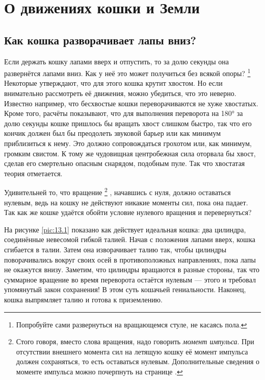 \chapter{О движениях кошки и Земли}

\section{Как кошка разворачивает лапы вниз?}

Если держать кошку лапами вверх и отпустить, то за долю секунды она развернётся лапами вниз.
Как у неё это может получиться без всякой опоры?%
\footnote{Попробуйте сами развернуться на вращающемся стуле, не касаясь пола.}
Некоторые утверждают, что для этого кошка крутит хвостом.
Но если внимательно рассмотреть её движения, можно убедиться, что это неверно.
Известно например, что бесхвостые кошки переворачиваются не хуже хвостатых.
Кроме того, расчёты показывают, что для выполнения переворота на 180° за долю секунды кошке пришлось бы вращать хвост слишком быстро, так что его кончик должен был бы преодолеть звуковой барьер или как минимум приблизиться к нему.
Это должно сопровождаться грохотом или, как минимум, громким свистом.
К тому же чудовищная центробежная сила оторвала бы хвост, сделав его смертельно опасным снарядом, подобным пуле.
Так что хвостатая теория отметается.

Удивительней то, что вращение%
\footnote{Стого говоря, вместо слова вращения, надо говорить \emph{момент импульса}.
При отсутствии внешнего момента сил на летящую кошку её момент импульса должен сохраняться, то есть оставаться нулевым.
Дополнительные сведения о моменте импульса можно почерпнуть на странице \pageref{Момент импульса}.}%
, начавшись с нуля, должно оставаться нулевым, ведь на кошку не действуют никакие моменты сил, пока она падает.
Так как же кошке удаётся обойти условие нулевого вращения и перевернуться?

На рисунке \ref{pic:13.1} показано как действует идеальная кошка: два цилиндра, соединённые невесомой гибкой талией.
Начав с положения лапами вверх, кошка сгибается в талии.
Затем она изворачивает талию так, чтобы цилиндры поворачивались вокруг своих осей в противоположных направлениях, пока лапы не окажутся внизу.
Заметим, что цилиндры вращаются в разные стороны, так что суммарное вращение во время переворота остаётся нулевым --- этого и требовал упомянутый закон сохранения!
В этом суть кошачьей гениальности.
Наконец, кошка выпрямляет талию и готова к приземлению.

